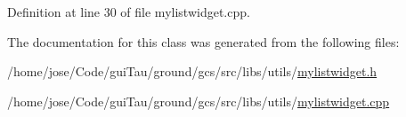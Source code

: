 Definition at line 30 of file mylistwidget.\-cpp.



The documentation for this class was generated from the following files\-:\begin{DoxyCompactItemize}
\item 
/home/jose/\-Code/gui\-Tau/ground/gcs/src/libs/utils/\hyperlink{mylistwidget_8h}{mylistwidget.\-h}\item 
/home/jose/\-Code/gui\-Tau/ground/gcs/src/libs/utils/\hyperlink{mylistwidget_8cpp}{mylistwidget.\-cpp}\end{DoxyCompactItemize}
